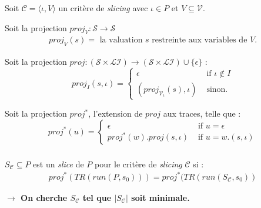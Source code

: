 \documentclass{beamer}
\begin{document}
      \begin{frame}
        \frametitle{\subsecname}

        Soit $\mathcal{C} = \langle \iota, V \rangle$ un critère de
        \emph{slicing} avec $\iota \in P$ et $V \subseteq \mathcal{V}$.

        Soit la projection $proj_V: \mathcal{S} \rightarrow \mathcal{S}$
        \begin{align*}
          proj_V(s) = \text{ la valuation }s \text{ restreinte aux variables de }V\text{.}
        \end{align*}
        \vspace{1em}\pause

        Soit la projection $proj: (\mathcal{S} \times \mathcal{LI})
        \rightarrow (\mathcal{S} \times \mathcal{LI}) \cup \{\epsilon\}$ :
        \[ proj_I(s,\iota) =
        \begin{cases}
          \epsilon & \text{ if } \iota \notin I \\
          (proj_{\mathcal{V}_{\iota}}(s),\iota)& \text{ sinon.}
        \end{cases}
        \]
        \vspace{1em}\pause
        
        Soit la projection $proj^*$, l'extension de $proj$ aux traces, telle que :
        \[ proj^*(u) =
        \begin{cases}
          \epsilon                & \text{ if } u = \epsilon \\
          proj^*(w).proj(s,\iota) & \text{ if } u = w.(s,\iota)
        \end{cases}
        \]
      \end{frame}

      \begin{frame}
        \frametitle{\subsecname}
        $S_{\mathcal{C}} \subseteq P$ est un \emph{slice} de $P$ pour le critère
        de \emph{slicing} $\mathcal{C}$ si :
        \begin{align*}
          proj^*(TR(run(P,s_0))) = proj^*(TR(run(S_{\mathcal{C}},s_0))
        \end{align*}
        \vspace{1em}\pause
        
        {\bf $\rightarrow$ On cherche $S_{\mathcal{C}}$ tel que $|S_{\mathcal{C}}|$ soit
          minimale.}
      \end{frame}
\end{document}
